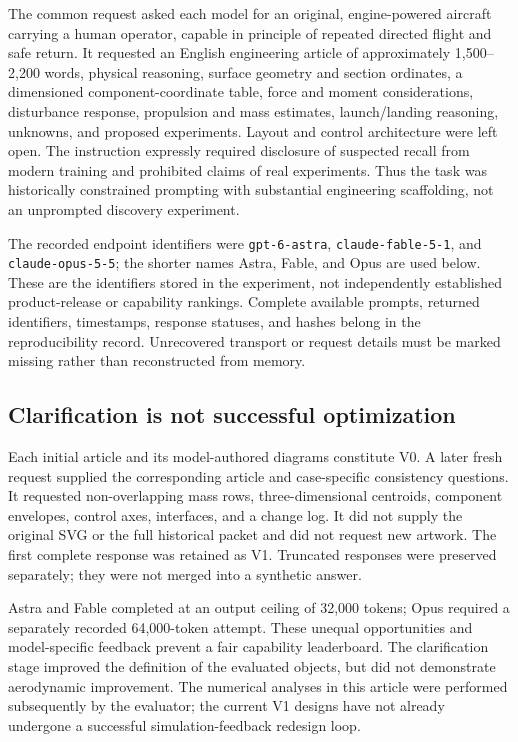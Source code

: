 \documentclass[11pt,a4paper]{article}
\begin{document}
The common request asked each model for an original, engine-powered aircraft carrying a human operator, capable in principle of repeated directed flight and safe return. It requested an English engineering article of approximately 1,500--2,200 words, physical reasoning, surface geometry and section ordinates, a dimensioned component-coordinate table, force and moment considerations, disturbance response, propulsion and mass estimates, launch/landing reasoning, unknowns, and proposed experiments. Layout and control architecture were left open. The instruction expressly required disclosure of suspected recall from modern training and prohibited claims of real experiments. Thus the task was historically constrained prompting with substantial engineering scaffolding, not an unprompted discovery experiment.

The recorded endpoint identifiers were \texttt{gpt-6-astra}, \texttt{claude-fable-5-1}, and \texttt{claude-opus-5-5}; the shorter names Astra, Fable, and Opus are used below. These are the identifiers stored in the experiment, not independently established product-release or capability rankings. Complete available prompts, returned identifiers, timestamps, response statuses, and hashes belong in the reproducibility record. Unrecovered transport or request details must be marked missing rather than reconstructed from memory.

\subsection{Clarification is not successful optimization}
Each initial article and its model-authored diagrams constitute V0. A later fresh request supplied the corresponding article and case-specific consistency questions. It requested non-overlapping mass rows, three-dimensional centroids, component envelopes, control axes, interfaces, and a change log. It did not supply the original SVG or the full historical packet and did not request new artwork. The first complete response was retained as V1. Truncated responses were preserved separately; they were not merged into a synthetic answer.

Astra and Fable completed at an output ceiling of 32,000 tokens; Opus required a separately recorded 64,000-token attempt. These unequal opportunities and model-specific feedback prevent a fair capability leaderboard. The clarification stage improved the definition of the evaluated objects, but did not demonstrate aerodynamic improvement. The numerical analyses in this article were performed subsequently by the evaluator; the current V1 designs have not already undergone a successful simulation-feedback redesign loop.
\end{document}
